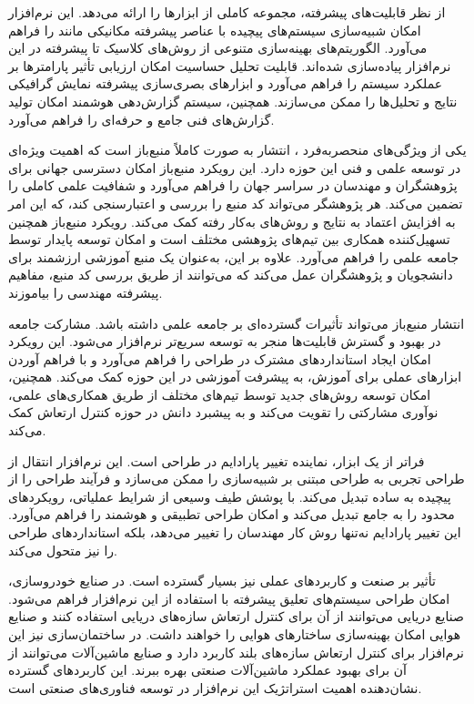 از نظر قابلیت‌های پیشرفته،  مجموعه کاملی از ابزارها را ارائه می‌دهد. این نرم‌افزار امکان شبیه‌سازی سیستم‌های پیچیده با عناصر پیشرفته مکانیکی مانند  را فراهم می‌آورد. الگوریتم‌های بهینه‌سازی متنوعی از روش‌های کلاسیک تا پیشرفته در این نرم‌افزار پیاده‌سازی شده‌اند. قابلیت تحلیل حساسیت امکان ارزیابی تأثیر پارامترها بر عملکرد سیستم را فراهم می‌آورد و ابزارهای بصری‌سازی پیشرفته نمایش گرافیکی نتایج و تحلیل‌ها را ممکن می‌سازند. همچنین، سیستم گزارش‌دهی هوشمند امکان تولید گزارش‌های فنی جامع و حرفه‌ای را فراهم می‌آورد.

یکی از ویژگی‌های منحصربه‌فرد ، انتشار به صورت کاملاً منبع‌باز است که اهمیت ویژه‌ای در توسعه علمی و فنی این حوزه دارد. این رویکرد منبع‌باز امکان دسترسی جهانی برای پژوهشگران و مهندسان در سراسر جهان را فراهم می‌آورد و شفافیت علمی کاملی را تضمین می‌کند. هر پژوهشگر می‌تواند کد منبع را بررسی و اعتبارسنجی کند، که این امر به افزایش اعتماد به نتایج و روش‌های به‌کار رفته کمک می‌کند. رویکرد منبع‌باز همچنین تسهیل‌کننده همکاری بین تیم‌های پژوهشی مختلف است و امکان توسعه پایدار توسط جامعه علمی را فراهم می‌آورد. علاوه بر این،  به‌عنوان یک منبع آموزشی ارزشمند برای دانشجویان و پژوهشگران عمل می‌کند که می‌توانند از طریق بررسی کد منبع، مفاهیم پیشرفته مهندسی را بیاموزند.

انتشار منبع‌باز  می‌تواند تأثیرات گسترده‌ای بر جامعه علمی داشته باشد. مشارکت جامعه در بهبود و گسترش قابلیت‌ها منجر به توسعه سریع‌تر نرم‌افزار می‌شود. این رویکرد امکان ایجاد استانداردهای مشترک در طراحی  را فراهم می‌آورد و با فراهم آوردن ابزارهای عملی برای آموزش، به پیشرفت آموزشی در این حوزه کمک می‌کند. همچنین، امکان توسعه روش‌های جدید توسط تیم‌های مختلف از طریق همکاری‌های علمی، نوآوری مشارکتی را تقویت می‌کند و به پیشبرد دانش در حوزه کنترل ارتعاش کمک می‌کند.

 فراتر از یک ابزار، نماینده تغییر پارادایم در طراحی  است. این نرم‌افزار انتقال از طراحی تجربی به طراحی مبتنی بر شبیه‌سازی را ممکن می‌سازد و فرآیند طراحی را از پیچیده به ساده تبدیل می‌کند. با پوشش طیف وسیعی از شرایط عملیاتی، رویکردهای محدود را به جامع تبدیل می‌کند و امکان طراحی تطبیقی و هوشمند را فراهم می‌آورد. این تغییر پارادایم نه‌تنها روش کار مهندسان را تغییر می‌دهد، بلکه استانداردهای طراحی را نیز متحول می‌کند.

تأثیر  بر صنعت و کاربردهای عملی نیز بسیار گسترده است. در صنایع خودروسازی، امکان طراحی سیستم‌های تعلیق پیشرفته با استفاده از این نرم‌افزار فراهم می‌شود. صنایع دریایی می‌توانند از آن برای کنترل ارتعاش سازه‌های دریایی استفاده کنند و صنایع هوایی امکان بهینه‌سازی ساختارهای هوایی را خواهند داشت. در ساختمان‌سازی نیز این نرم‌افزار برای کنترل ارتعاش سازه‌های بلند کاربرد دارد و صنایع ماشین‌آلات می‌توانند از آن برای بهبود عملکرد ماشین‌آلات صنعتی بهره ببرند. این کاربردهای گسترده نشان‌دهنده اهمیت استراتژیک این نرم‌افزار در توسعه فناوری‌های صنعتی است.


